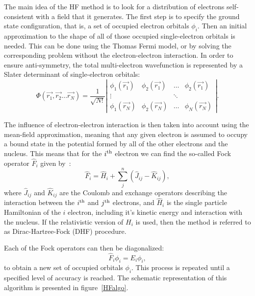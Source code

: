 The main idea of the HF method is to look for a distribution of electrons self-consistent with a field that it generates. The first step is to specify the ground state configuration, that is, a set of occupied electron orbitals $\phi_i$. Then an initial approximation to the shape of all of those occupied single-electron orbitals is needed. This can be done using the Thomas Fermi model, or by solving the corresponding problem without the electron-electron interaction.
In order to ensure anti-symmetry, the total multi-electron wavefunction is represented by a Slater determinant of single-electron orbitals:
\begin{equation} \label{HFdet}
  \Phi(\vec{r_1}, \vec{r_2} ... \vec{r_N}) = \frac{1}{\sqrt{N!}}
   \left| \begin{matrix} \phi_1(\vec{r_1}) & \phi_2(\vec{r_1}) & \dots & \phi_2(\vec{r_1}) \\
    \vdots & & \ddots &  \\ 
    \phi_1(\vec{r_N}) & \phi_2(\vec{r_N})& \dots & \phi_N(\vec{r_N})  \end{matrix} \right|.
\end{equation}

The influence of electron-electron interaction is then taken into account using the mean-field approximation, meaning that any given electron is assumed to occupy a bound state in the potential formed by all of the other electrons and the nucleus. This means that for the $i^{\rm{th}}$ electron we can find the so-called Fock operator $\widehat{F}_i$ given by~\cite{560430312}:
\begin{equation}
    \widehat{F}_i = \widehat{H}_i+\sum_j^n (\widehat{J}_{ij} - \widehat{K}_{ij}),
\end{equation}
where $\widehat{J}_{ij}$ and $\widehat{K}_{ij}$ are the Coulomb and exchange operators describing the interaction between the $i^{\rm{th}}$ and $j^{\rm{th}}$ electrons, and $\widehat{H}_i$ is the single particle Hamiltonian of the $i$ electron, including it's kinetic energy and interaction with the nucleus. If the relativistic version of $H_i$ is used, then the method is referred to as Dirac-Hartree-Fock (DHF) procedure.

Each of the Fock operators can then be diagonalized:
\begin{equation}
    \widehat{F}_i \phi_i = E_i \phi_i,
\end{equation}
to obtain a new set of occupied orbitals $\phi_i$. This process is repeated until a specified level of accuracy is reached. The schematic representation of this algorithm is presented in figure~\ref{HFalgo}.

